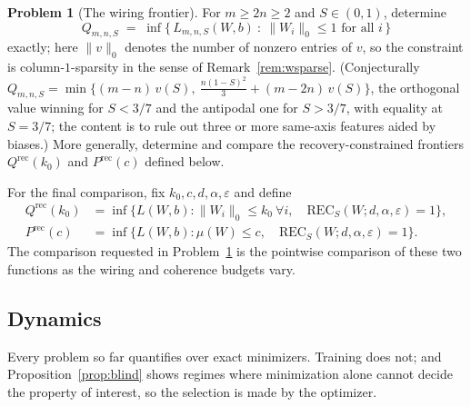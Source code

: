 \documentclass[11pt]{amsart}
\theoremstyle{plain}
\theoremstyle{definition}
\newtheorem{problem}[theorem]{Problem}
\begin{document}
\begin{problem}[The wiring frontier]\label{prob:wsparse}
For $m\ge 2n\ge2$ and $S\in(0,1)$, determine
\[
Q_{m,n,S} \;=\; \inf\bigl\{\,L_{m,n,S}(W,b)\ :\ \|W_i\|_0\le 1 \text{ for all } i\,\bigr\}
\]
exactly; here $\|v\|_0$ denotes the number of nonzero entries of $v$, so the constraint is column-$1$-sparsity in the sense of Remark~\ref{rem:wsparse}. (Conjecturally $Q_{m,n,S}=\min\bigl\{(m-n)\,v(S),\ \tfrac{n(1-S)^2}{3}+(m-2n)\,v(S)\bigr\}$, the orthogonal value winning for $S<3/7$ and the antipodal one for $S>3/7$, with equality at $S=3/7$; the content is to rule out three or more same-axis features aided by biases.) More generally, determine and compare the recovery-constrained frontiers $Q^{\mathrm{rec}}(k_0)$ and $P^{\mathrm{rec}}(c)$ defined below.
\end{problem}

For the final comparison, fix $k_0,c,d,\alpha,\varepsilon$ and define
\[
\begin{aligned}
Q^{\mathrm{rec}}(k_0)&=\inf\{L(W,b):\|W_i\|_0\le k_0\ \forall i,\quad
\mathrm{REC}_S(W;d,\alpha,\varepsilon)=1\},\\
P^{\mathrm{rec}}(c)&=\inf\{L(W,b):\mu(W)\le c,\quad
\mathrm{REC}_S(W;d,\alpha,\varepsilon)=1\}.
\end{aligned}
\]
The comparison requested in Problem~\ref{prob:wsparse} is the pointwise comparison of these two functions as the wiring and coherence budgets vary.

\subsection{Dynamics}

Every problem so far quantifies over exact minimizers. Training does not; and Proposition~\ref{prop:blind} shows regimes where minimization alone cannot decide the property of interest, so the selection is made by the optimizer.
\end{document}
